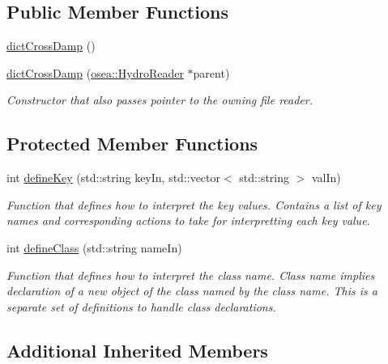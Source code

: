\subsection*{Public Member Functions}
\begin{DoxyCompactItemize}
\item 
\hyperlink{classosea_1_1dict_cross_damp_aa010d78024ccc77384a2865ea0103a57}{dict\-Cross\-Damp} ()
\item 
\hyperlink{classosea_1_1dict_cross_damp_a0e60bc37db145f98079dc4342a62fa2f}{dict\-Cross\-Damp} (\hyperlink{classosea_1_1_hydro_reader}{osea\-::\-Hydro\-Reader} $\ast$parent)
\begin{DoxyCompactList}\small\item\em Constructor that also passes pointer to the owning file reader. \end{DoxyCompactList}\end{DoxyCompactItemize}
\subsection*{Protected Member Functions}
\begin{DoxyCompactItemize}
\item 
int \hyperlink{classosea_1_1dict_cross_damp_a904e8a922f02b5d7122860a325ac739d}{define\-Key} (std\-::string key\-In, std\-::vector$<$ std\-::string $>$ val\-In)
\begin{DoxyCompactList}\small\item\em Function that defines how to interpret the key values. Contains a list of key names and corresponding actions to take for interpretting each key value. \end{DoxyCompactList}\item 
int \hyperlink{classosea_1_1dict_cross_damp_a7009adaf4e8191a51b8001afef77d001}{define\-Class} (std\-::string name\-In)
\begin{DoxyCompactList}\small\item\em Function that defines how to interpret the class name. Class name implies declaration of a new object of the class named by the class name. This is a separate set of definitions to handle class declarations. \end{DoxyCompactList}\end{DoxyCompactItemize}
\subsection*{Additional Inherited Members}


